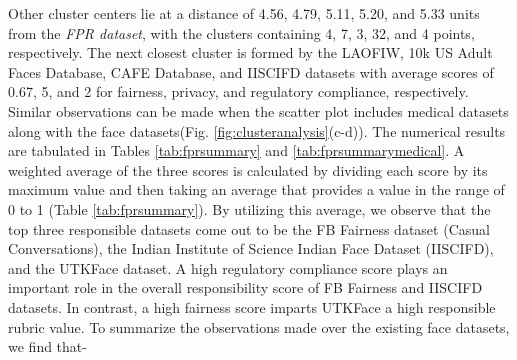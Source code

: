 \documentclass[journal]{IEEEtran}
\begin{document}
Other cluster centers lie at a distance of 4.56, 4.79, 5.11, 5.20, and 5.33 units from the \textit{FPR dataset}, with the clusters containing 4, 7, 3, 32, and 4 points, respectively. The next closest cluster is formed by the LAOFIW, 10k US Adult Faces Database, CAFE Database, and IISCIFD datasets with average scores of 0.67, 5, and 2 for fairness, privacy, and regulatory compliance, respectively. Similar observations can be made when the scatter plot includes medical datasets along with the face datasets(Fig. \ref{fig:clusteranalysis}(c-d)). The  numerical results are tabulated in Tables \ref{tab:fprsummary} and \ref{tab:fprsummarymedical}. A weighted average of the three scores is calculated by dividing each score by its maximum value and then taking an average that provides a value in the range of 0 to 1 (Table \ref{tab:fprsummary}). By utilizing this average, we observe that the top three responsible datasets come out to be the FB Fairness dataset (Casual Conversations), the Indian Institute of Science Indian Face Dataset (IISCIFD), and the UTKFace dataset. A high regulatory compliance score plays an important role in the overall responsibility score of FB Fairness and IISCIFD datasets. In contrast, a high fairness score imparts UTKFace a high responsible rubric value. To summarize the observations made over the existing face datasets, we find that-
\end{document}
